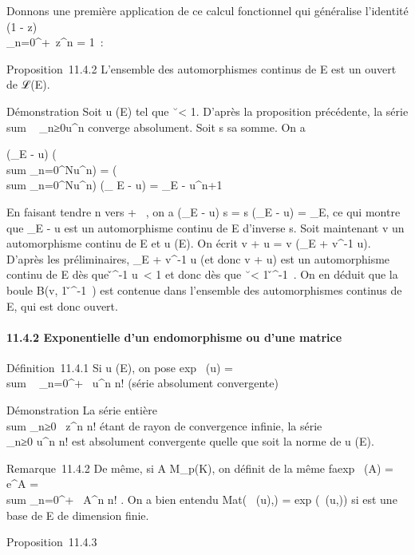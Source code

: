 \documentclass[]{article}
\begin{document}
Donnons une première application de ce calcul fonctionnel qui généralise
l'identité (1 - z)\\\sum
 _n=0^+\infty~z^n = 1~:

Proposition~11.4.2 L'ensemble des automorphismes continus de E est un
ouvert de ℒ(E).

Démonstration Soit u (E) tel que
\u\ < 1.
D'après la proposition précédente, la série
\\sum ~
_n≥0u^n converge absolument. Soit s sa somme. On a

(\mathrmId_E - u) \cdot\left
(\\sum
_n=0^Nu^n\right ) =
\left (\\sum
_n=0^Nu^n\right ) \cdot
(\mathrmId_ E - u) =
\mathrmId_E - u^n+1

En faisant tendre n vers + \infty~, on a
(\mathrmId_E - u) \cdot s = s \cdot
(\mathrmId_E - u) =
\mathrmId_E, ce qui montre que
\mathrmId_E - u est un automorphisme continu
de E d'inverse s. Soit maintenant v un automorphisme continu de E et u
(E). On écrit v + u = v \cdot (\mathrmId_E +
v^-1 \cdot u). D'après les préliminaires,
\mathrmId_E + v^-1 \cdot u (et donc v
+ u) est un automorphisme continu de E dès que
\v^-1 \cdot u\
< 1 et donc dès que
\u\ < 1
\over
\v^-1\ .
On en déduit que la boule B(v, 1 \over
\v^-1\ )
est contenue dans l'ensemble des automorphismes continus de E, qui est
donc ouvert.

\paragraph{11.4.2 Exponentielle d'un endomorphisme ou d'une matrice}

Définition~11.4.1 Si u (E), on pose exp~ (u)
= \\sum ~
_n=0^+\infty~ u^n \over n! (série
absolument convergente)

Démonstration La série entière
\\sum  _n≥0~
z^n \over n! étant de rayon de convergence
infinie, la série \\\sum
 _n≥0 u^n \over n! est
absolument convergente quelle que soit la norme de u (E).

Remarque~11.4.2 De même, si A \in M_p(K), on définit de la même
fa\ccon exp~ (A) =
e^A =\ \\sum
 _n=0^+\infty~ A^n \over n! .
On a bien entendu
Mat(\exp~ (u),)
= exp (\Mat~(u,\mathcal{E})) si
\mathcal{E} est une base de E de dimension finie.

Proposition~11.4.3
\end{document}

